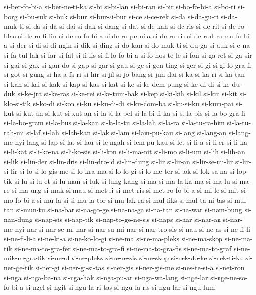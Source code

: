 {si-ber-fo-bi-a si-ber-ne-ti-ka si-bi si-bi-lan si-bi-ran si-bir
si-bo-fo-bi-a si-bo-ri si-borg si-bu-suk si-buk si-bur si-bur-si-bur si-ce
si-ce-rek si-da si-da-gu-ri si-da-muk-ti si-da-si-da si-dai si-dak si-dang
si-dat si-de-kah si-de-ris si-de-rit si-de-ro-blas si-de-ro-fi-lin
si-de-ro-fo-bi-a si-de-ro-pe-ni-a si-de-ro-sis si-de-rod-ro-mo-fo-bi-a
si-der si-di si-di-ngin si-dik si-ding si-do-kan si-do-muk-ti si-du-ga
si-duk si-e-na si-fa-tul-lah si-far si-fat si-fi-lis si-fi-lo-fo-bi-a
si-fo-nos-te-le si-fon si-ga-ret si-ga-sir si-gai si-gak si-gan-do si-gap
si-gar si-gau si-ge si-gen-ting si-ger si-gi si-gi-lo-gra-fi si-got
si-gung si-ha-a-fa-ri si-hir si-jil si-jo-bang si-jun-dai si-ka si-ka-ri
si-ka-tan si-kah si-kai si-kak si-kap si-kas si-kat si-ke si-ke-dem-pung
si-ke-di-di si-ke-du-duk si-ke-jut si-ke-ras si-ke-rei si-ke-tum-bak
si-kep si-ki-kih si-kil si-kin si-kit si-klo-si-tik si-ko-di si-kon si-ku
si-ku-di-di si-ku-dom-ba si-ku-si-ku si-kum-pai si-kut si-kut-an
si-kut-si-kut-an si-la si-la-bel si-la-bi-fi-ka-si si-la-bis
si-la-bo-gra-fi si-la-bo-gram si-la-bus si-la-kan si-la-la-tu si-la-lah
si-la-ra si-la-tu-ra-him si-la-tu-rah-mi si-laf si-lah si-lah-kan si-lak
si-lam si-lam-pu-kau si-lang si-lang-an si-lang-me-nyi-lang si-lap si-lat
si-lau si-le-ngah si-lem-pu-kau si-let si-li-a si-li-er si-li-ka si-li-kat
si-li-ko-na si-li-ko-sis si-li-kon si-li-ma-nit si-li-mo si-li-um si-lih
si-lih-an si-lik si-lin-der si-lin-dris si-lin-dro-id si-lin-dung si-lir
si-lir-an si-lir-se-mi-lir si-lir-si-lir si-lo si-lo-gis-me si-lo-kra-ma
si-lo-lo-gi si-lo-me-ter si-lok si-lok-sa-na si-lop-tik si-lu si-lu-et
si-lu-man si-luk si-lung-kang si-ma si-ma-la-ka-ma si-ma-lu si-ma-re
si-ma-ung si-mak si-mau si-met-ri si-met-ris si-met-ro-fo-bi-a si-mi-le
si-mit si-mo-fo-bi-a si-mu-la-si si-mu-la-tor si-mu-lak-ra si-mul-fiks
si-mul-ta-ni-tas si-mul-tan si-mun-tu si-na-bar si-na-go-ge si-na-na-ga
si-na-tan si-na-war si-nam-bung si-nan-dung si-nap-sis si-nap-tik
si-nap-to-ge-ne-sis si-naps si-nar si-nar-an si-nar-me-nyi-nar
si-nar-se-mi-nar si-nar-su-mi-nar si-nar-tro-sis si-nau si-ne-as
si-ne-fi-li si-ne-fi-li-a si-ne-ki-a si-ne-ko-lo-gi si-ne-ma
si-ne-ma-pleks si-ne-ma-skop si-ne-ma-tik si-ne-ma-to-gra-fer
si-ne-ma-to-gra-fi si-ne-ma-to-gra-fis si-ne-ma-to-graf
si-ne-mik-ro-gra-fik si-ne-ol si-ne-pleks si-ne-re-sis si-ne-skop
si-nek-do-ke si-nek-ti-ka si-ner-ge-tik si-ner-gi si-ner-gi-si-tas
si-ner-gis si-ner-gis-me si-nes-te-si-a si-net-ron si-nga si-nga-ba-na
si-nga-hak si-nga-pu-ar si-nga-wa-lang si-nge-lar si-nge-ne-so-fo-bi-a
si-ngel si-ngit si-ngu-la-ri-tas si-ngu-la-ris si-ngu-lar si-ngu-lum
}
